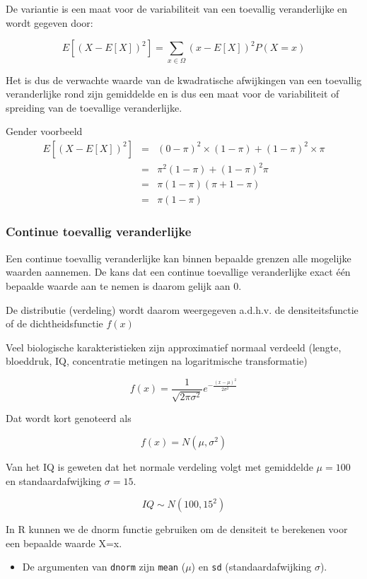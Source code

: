 \documentclass[
  12pt,dutch,coursenotes]{book}
\newcommand{\passthrough}[1]{#1}
\providecommand{\tightlist}{%
  \setlength{\itemsep}{0pt}\setlength{\parskip}{0pt}}
\begin{document}
De variantie is een maat voor de variabiliteit van een toevallig veranderlijke en wordt gegeven door:

\[E[(X-E[X])^2]=\sum\limits_{x\in\Omega} (x-E[X])^2 P(X=x)\]

Het is dus de verwachte waarde van de kwadratische afwijkingen van een toevallig veranderlijke rond zijn gemiddelde en is dus een maat voor de variabiliteit of spreiding van de toevallige veranderlijke.

Gender voorbeeld
\begin{eqnarray}
    E[(X-E[X])^2]&=&(0-\pi)^2\times (1-\pi)+(1-\pi)^2 \times \pi\\
    &=& \pi^2 (1-\pi) + (1-\pi)^2 \pi\\
    &=&\pi (1-\pi)(\pi+1-\pi)\\
    &=&\pi(1-\pi)
    \end{eqnarray}

\hypertarget{continue-toevallig-veranderlijke}{%
\subsubsection{Continue toevallig veranderlijke}\label{continue-toevallig-veranderlijke}}

Een continue toevallig veranderlijke kan binnen bepaalde grenzen alle mogelijke waarden aannemen. De kans dat een continue toevallige veranderlijke exact één bepaalde waarde aan te nemen is daarom gelijk aan 0.

De distributie (verdeling) wordt daarom weergegeven a.d.h.v. de densiteitsfunctie of de dichtheidsfunctie \(f(x)\)

Veel biologische karakteristieken zijn approximatief normaal verdeeld (lengte, bloeddruk, IQ, concentratie metingen na logaritmische transformatie)

\[f(x) = \frac{1}{\sqrt{2\pi\sigma^2}} e^{-\frac{(x-\mu)^2}{2\sigma^2}}\]

Dat wordt kort genoteerd als

\[f(x) = N(\mu,\sigma^2)\]

Van het IQ is geweten dat het normale verdeling volgt met gemiddelde \(\mu=100\) en standaardafwijking \(\sigma=15\).

\[IQ \sim N(100,15^2)\]

In R kunnen we de dnorm functie gebruiken om de densiteit te berekenen voor een bepaalde waarde X=x.

\begin{itemize}
\tightlist
\item
  De argumenten van \passthrough{\lstinline!dnorm!} zijn \passthrough{\lstinline!mean!} (\(\mu\)) en \passthrough{\lstinline!sd!} (standaardafwijking \(\sigma\)).
\end{itemize}
\end{document}
